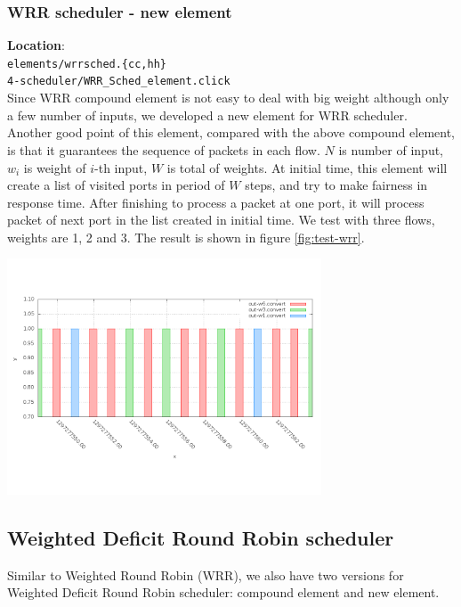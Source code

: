 \documentclass[a4paper]{article}
\begin{document}
  \subsubsection{WRR scheduler - new element}
  \textbf{Location}: \\
  \texttt{elements/wrrsched.\{cc,hh\}} \\ 
  \texttt{4-scheduler/WRR\_Sched\_element.click}\\
  Since WRR compound element is not easy to deal with big weight although only a few number of inputs, we developed a new element for WRR scheduler. Another good point of this element, compared with the above compound element, is that it guarantees the sequence of packets in each flow. $N$ is number of input, $w_i$ is weight of $i$-th input, $W$ is total of weights. At initial time, this element will create a list of visited ports in period of $W$ steps, and try to make fairness in response time. After finishing to process a packet at one port, it will process packet of next port in the list created in initial time. We test with three flows, weights are 1, 2 and 3. The result is shown in figure \ref{fig:test-wrr}.
  \begin{center}
	\includegraphics[width=0.70\textwidth]{wrr-dense.png}
	\label{fig:test-wrr}
  \end{center}

  \subsection{Weighted Deficit Round Robin scheduler}
  Similar to Weighted Round Robin (WRR), we also have two versions for Weighted Deficit Round Robin scheduler: compound element and new element.
\end{document}
